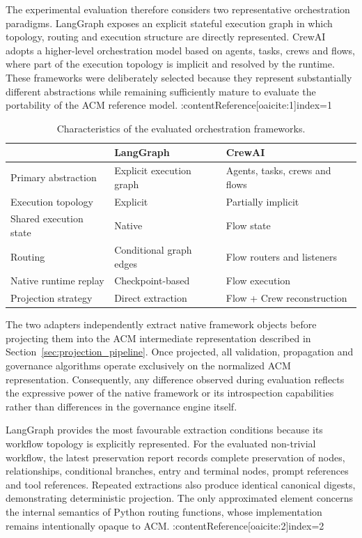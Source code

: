 \documentclass[10pt]{article}
\begin{document}
The experimental evaluation therefore considers two representative orchestration paradigms. LangGraph exposes an explicit stateful execution graph in which topology, routing and execution structure are directly represented. CrewAI adopts a higher-level orchestration model based on agents, tasks, crews and flows, where part of the execution topology is implicit and resolved by the runtime. These frameworks were deliberately selected because they represent substantially different abstractions while remaining sufficiently mature to evaluate the portability of the ACM reference model. :contentReference[oaicite:1]{index=1}

\begin{table}[t]
\centering
\caption{Characteristics of the evaluated orchestration frameworks.}
\label{tab:framework_characteristics}
\begin{tabularx}{\linewidth}{lXX}
\toprule
 & LangGraph & CrewAI \\
\midrule
Primary abstraction &
Explicit execution graph &
Agents, tasks, crews and flows \\

Execution topology &
Explicit &
Partially implicit \\

Shared execution state &
Native &
Flow state \\

Routing &
Conditional graph edges &
Flow routers and listeners \\

Native runtime replay &
Checkpoint-based &
Flow execution \\

Projection strategy &
Direct extraction &
Flow + Crew reconstruction \\
\bottomrule
\end{tabularx}
\end{table}

The two adapters independently extract native framework objects before projecting them into the ACM intermediate representation described in Section~\ref{sec:projection_pipeline}. Once projected, all validation, propagation and governance algorithms operate exclusively on the normalized ACM representation. Consequently, any difference observed during evaluation reflects the expressive power of the native framework or its introspection capabilities rather than differences in the governance engine itself.

LangGraph provides the most favourable extraction conditions because its workflow topology is explicitly represented. For the evaluated non-trivial workflow, the latest preservation report records complete preservation of nodes, relationships, conditional branches, entry and terminal nodes, prompt references and tool references. Repeated extractions also produce identical canonical digests, demonstrating deterministic projection. The only approximated element concerns the internal semantics of Python routing functions, whose implementation remains intentionally opaque to ACM. :contentReference[oaicite:2]{index=2}
\end{document}
